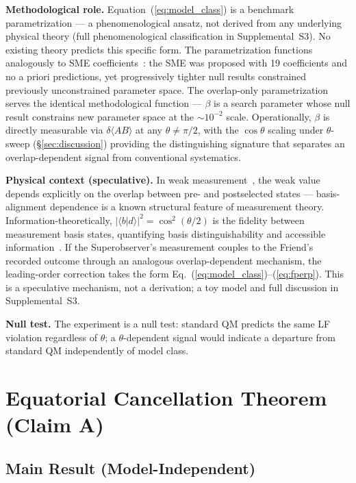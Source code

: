 \documentclass[twocolumn,aps,pra,superscriptaddress,floatfix,10pt]{revtex4-2}
\begin{document}
\textbf{Methodological role.} Equation~(\ref{eq:model_class}) is a benchmark parametrization --- a
phenomenological ansatz, not derived from any underlying physical theory
(full phenomenological classification in Supplemental~S3). No existing
theory predicts this specific form. The parametrization functions
analogously to SME coefficients~\cite{Colladay1997}: the SME was proposed with 19
coefficients and no a priori predictions, yet progressively tighter null
results constrained previously unconstrained parameter space. The
overlap-only parametrization serves the identical methodological function
--- $\beta$ is a search parameter whose null result constrains new parameter space
at the $\sim\!10^{-2}$ scale. Operationally, $\beta$ is directly measurable via $\delta\langle AB\rangle$ at
any $\theta \neq \pi/2$, with the $\cos\theta$ scaling under $\theta$-sweep (\S\ref{sec:discussion}) providing the
distinguishing signature that separates an overlap-dependent signal from
conventional systematics.

\textbf{Physical context (speculative).} In weak measurement~\cite{Aharonov1988}, the weak
value depends explicitly on the overlap between pre- and postselected
states --- basis-alignment dependence is a known structural feature of
measurement theory. Information-theoretically, $|\langle b|d\rangle|^2 = \cos^2(\theta/2)$ is
the fidelity between measurement basis states, quantifying basis
distinguishability and accessible information~\cite{Aharonov1988}. If the Superobserver's
measurement couples to the Friend's recorded outcome through an analogous
overlap-dependent mechanism, the leading-order correction takes the form
Eq.~(\ref{eq:model_class})--(\ref{eq:fperp}). This is a speculative mechanism, not a derivation; a toy model
and full discussion in Supplemental~S3.

\textbf{Null test.} The experiment is a null test: standard QM predicts the same
LF violation regardless of $\theta$; a $\theta$-dependent signal would indicate a
departure from standard QM independently of model class.

\section{Equatorial Cancellation Theorem (Claim A)}
\label{sec:theorem}

\subsection{Main Result (Model-Independent)}
\label{sec:main_result}
\end{document}
